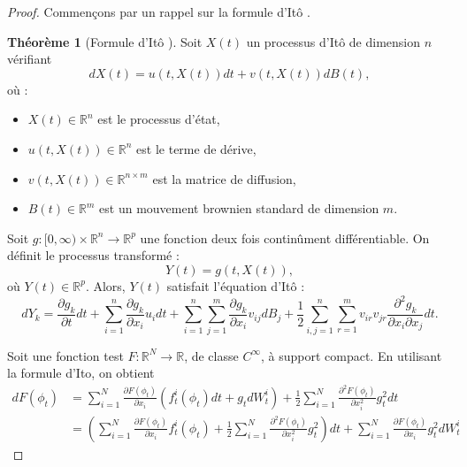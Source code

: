 \documentclass[a4paper,10pt]{article}
\theoremstyle{definition} %
\theoremstyle{definition} %
\theoremstyle{definition} %
\newtheorem{theorem}[definition]{Théorème}
\theoremstyle{definition} %
\begin{document}
\begin{proof}
Commençons par un rappel sur la formule d'Itô . 
\begin{theorem}[Formule d'Itô \cite{Oksendal2003}]
Soit \( X(t) \) un processus d’Itô de dimension \( n \) vérifiant  
\[
dX(t) = u(t, X(t)) dt + v(t, X(t)) dB(t),
\]
où :
\begin{itemize}
    \item \( X(t) \in \mathbb{R}^n \) est le processus d’état,
    \item \( u(t, X(t)) \in \mathbb{R}^n \) est le terme de dérive,
    \item \( v(t, X(t)) \in \mathbb{R}^{n \times m} \) est la matrice de diffusion,
    \item \( B(t) \in \mathbb{R}^m \) est un mouvement brownien standard de dimension \( m \).
\end{itemize}

Soit \( g: [0, \infty) \times \mathbb{R}^n \to \mathbb{R}^p \) une fonction deux fois continûment différentiable.  
On définit le processus transformé :
\[
Y(t) = g(t, X(t)),
\]
où \( Y(t) \in \mathbb{R}^p \).  
Alors, \( Y(t) \) satisfait l’équation d’Itô :
\[
dY_k = \frac{\partial g_k}{\partial t} dt 
+ \sum\limits_{i=1}^{n} \frac{\partial g_k}{\partial x_i} u_i dt 
+ \sum\limits_{i=1}^{n} \sum\limits_{j=1}^{m} \frac{\partial g_k}{\partial x_i} v_{ij} dB_j
+ \frac{1}{2} \sum\limits_{i,j=1}^{n} \sum\limits_{r=1}^{m} v_{ir} v_{jr} \frac{\partial^2 g_k}{\partial x_i \partial x_j} dt.
\]
\end{theorem}
\vspace{3em}



Soit une fonction test $F: \mathbb{R}^N \rightarrow \mathbb{R}$, de classe $C^{\infty}$, à support compact. En utilisant la formule d'Ito, on obtient
\begin{align*}
    dF(\phi_t) &= \sum\limits_{i=1}^N \frac{\partial F(\phi_t)}{\partial x_i} (f^i_t(\phi_t)dt + g_tdW^i_t) + \frac{1}{2} \sum\limits_{i=1}^N  \frac{\partial^2 F(\phi_t)}{\partial x_i^2} g_t^2 dt \\
    &= \left(\sum\limits_{i=1}^N \frac{\partial F(\phi_t)}{\partial x_i} f^i_t(\phi_t) + \frac{1}{2} \sum\limits_{i=1}^N  \frac{\partial^2 F(\phi_t)}{\partial x_i^2} g_t^2\right)dt + \sum\limits_{i=1}^N \frac{\partial F(\phi_t)}{\partial x_i}  g_t^2dW^i_t
\end{align*}


\end{proof}
\end{document}
